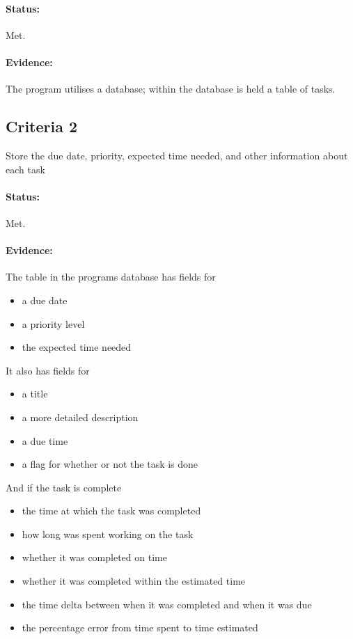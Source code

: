 \documentclass{article}
\begin{document}
\paragraph{Status:}
Met.

\paragraph{Evidence:}
The program utilises a database;
within the database is held a table of tasks.

\subsection{Criteria 2}
Store the due date, priority, expected time needed, and other information about each task

\paragraph{Status:}
Met.
\paragraph{Evidence:}
The table in the programs database has fields for
\begin{itemize}
	\item a due date
	\item a priority level
	\item the expected time needed
\end{itemize}

It also has fields for
\begin{itemize}
	\item a title
	\item a more detailed description
	\item a due time
	\item a flag for whether or not the task is done
\end{itemize}

And if the task is complete
\begin{itemize}
	\item the time at which the task was completed
	\item how long was spent working on the task
	\item whether it was completed on time
	\item whether it was completed within the estimated time
	\item the time delta between when it was completed and when it was due
	\item the percentage error from time spent to time estimated
\end{itemize}
\end{document}
